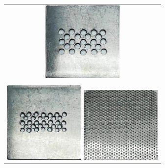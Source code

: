 \begin{figure}[htpb]
\begin{tabular}{c}
    \begin{minipage}{0.50\hsize}
    \centering
    \includegraphics[keepaspectratio, width=4cm]{./data/4.png}
    \caption{}
    \end{minipage}

    \\
    \\

    \begin{minipage}{0.50\hsize}
      \centering
      \includegraphics[keepaspectratio, width=4cm]{./data/5.png}
      \caption{}
      \end{minipage}

      \begin{minipage}{0.50\hsize}
      \centering
      \includegraphics[keepaspectratio, width=4cm]{./data/6.png}
      \caption{}
      \end{minipage}
  \end{tabular}
\end{figure}

